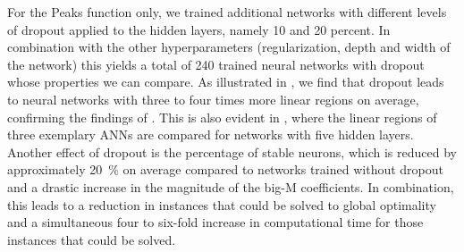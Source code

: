 For the Peaks function only, we trained additional networks with different levels of dropout applied to the hidden layers, namely 10 and 20 percent. In combination with the other hyperparameters (regularization, depth and width of the network) this yields a total of 240 trained neural networks with dropout whose properties we can compare. As illustrated in , we find that dropout leads to neural networks with three to four times more linear regions on average, confirming the findings of \citet{Zhang2020a}. This is also evident in , where the linear regions of three exemplary ANNs are compared for networks with five hidden layers. Another effect of dropout is the percentage of stable neurons, which is reduced by approximately 20~\% on average compared to networks trained without dropout and a drastic increase in the magnitude of the big-M coefficients. In combination, this leads to a reduction in instances that could be solved to global optimality and a simultaneous four to six-fold increase in computational time for those instances that could be solved. 
